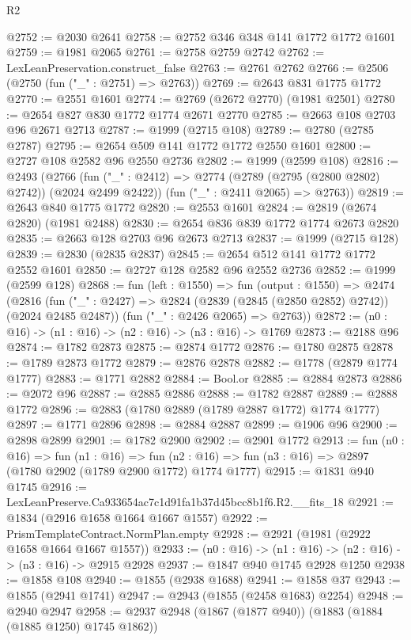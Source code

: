 \begin{lexlean}{R2}
\begin{coremodule}
@2752 := @2030 @2641
@2758 := @2752 @346 @348 @141 @1772 @1772 @1601
@2759 := @1981 @2065
@2761 := @2758 @2759 @2742
@2762 := LexLeanPreservation.construct_false
@2763 := @2761 @2762
@2766 := @2506 (@2750 (fun ("_" : @2751) => @2763))
@2769 := @2643 @831 @1775 @1772
@2770 := @2551 @1601
@2774 := @2769 (@2672 @2770) (@1981 @2501)
@2780 := @2654 @827 @830 @1772 @1774 @2671 @2770
@2785 := @2663 @108 @2703 @96 @2671 @2713
@2787 := @1999 (@2715 @108)
@2789 := @2780 (@2785 @2787)
@2795 := @2654 @509 @141 @1772 @1772 @2550 @1601
@2800 := @2727 @108 @2582 @96 @2550 @2736
@2802 := @1999 (@2599 @108)
@2816 := @2493
    (@2766
      (fun ("_" : @2412) => @2774 (@2789 (@2795 (@2800 @2802) @2742)) (@2024 @2499 @2422))
      (fun ("_" : @2411 @2065) => @2763))
@2819 := @2643 @840 @1775 @1772
@2820 := @2553 @1601
@2824 := @2819 (@2674 @2820) (@1981 @2488)
@2830 := @2654 @836 @839 @1772 @1774 @2673 @2820
@2835 := @2663 @128 @2703 @96 @2673 @2713
@2837 := @1999 (@2715 @128)
@2839 := @2830 (@2835 @2837)
@2845 := @2654 @512 @141 @1772 @1772 @2552 @1601
@2850 := @2727 @128 @2582 @96 @2552 @2736
@2852 := @1999 (@2599 @128)
@2868 := fun (left : @1550) =>
  fun (output : @1550) =>
  @2474
    (@2816
      (fun ("_" : @2427) => @2824 (@2839 (@2845 (@2850 @2852) @2742)) (@2024 @2485 @2487))
      (fun ("_" : @2426 @2065) => @2763))
@2872 := (n0 : @16) -> (n1 : @16) -> (n2 : @16) -> (n3 : @16) -> @1769
@2873 := @2188 @96
@2874 := @1782 @2873
@2875 := @2874 @1772
@2876 := @1780 @2875
@2878 := @1789 @2873 @1772
@2879 := @2876 @2878
@2882 := @1778 (@2879 @1774 @1777)
@2883 := @1771 @2882
@2884 := Bool.or
@2885 := @2884 @2873
@2886 := @2072 @96
@2887 := @2885 @2886
@2888 := @1782 @2887
@2889 := @2888 @1772
@2896 := @2883 (@1780 @2889 (@1789 @2887 @1772) @1774 @1777)
@2897 := @1771 @2896
@2898 := @2884 @2887
@2899 := @1906 @96
@2900 := @2898 @2899
@2901 := @1782 @2900
@2902 := @2901 @1772
@2913 := fun (n0 : @16) =>
  fun (n1 : @16) =>
  fun (n2 : @16) => fun (n3 : @16) => @2897 (@1780 @2902 (@1789 @2900 @1772) @1774 @1777)
@2915 := @1831 @940 @1745
@2916 := LexLeanPreserve.Ca933654ac7c1d91fa1b37d45bcc8b1f6.R2.__fits_18
@2921 := @1834 (@2916 @1658 @1664 @1667 @1557)
@2922 := PrismTemplateContract.NormPlan.empty
@2928 := @2921 (@1981 (@2922 @1658 @1664 @1667 @1557))
@2933 := (n0 : @16) -> (n1 : @16) -> (n2 : @16) -> (n3 : @16) -> @2915 @2928
@2937 := @1847 @940 @1745 @2928 @1250
@2938 := @1858 @108
@2940 := @1855 (@2938 @1688)
@2941 := @1858 @37
@2943 := @1855 (@2941 @1741)
@2947 := @2943 (@1855 (@2458 @1683) @2254)
@2948 := @2940 @2947
@2958 := @2937 @2948 (@1867 (@1877 @940)) (@1883 (@1884 (@1885 @1250) @1745 @1862))

\end{coremodule}
\end{lexlean}
